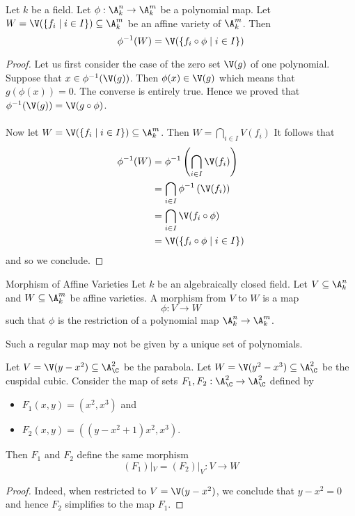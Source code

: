 \documentclass[a4paper]{article}
\begin{document}
\begin{prp}{}{} Let $k$ be a field. Let $\phi:\A_k^n\to\A_k^m$ be a polynomial map. Let $W=\V(\{f_i\;|\;i\in I\})\subseteq\A_k^m$ be an affine variety of $\A_k^m$. Then $$\phi^{-1}(W)=\V(\{f_i\circ\phi\;|\;i\in I\})$$ \tcbline
\begin{proof}
Let us first consider the case of the zero set $\V(g)$ of one polynomial. Suppose that $x\in\phi^{-1}(\V(g))$. Then $\phi(x)\in\V(g)$ which means that $g(\phi(x))=0$. The converse is entirely true. Hence we proved that $\phi^{-1}(\V(g))=\V(g\circ\phi)$. \\~\\

Now let $W=\V(\{f_i\;|\;i\in I\})\subseteq\A_k^m$. Then $W=\bigcap_{i\in I}V(f_i)$ It follows that 
\begin{align*}
\phi^{-1}(W)&=\phi^{-1}\left(\bigcap_{i\in I}\V(f_i)\right)\\
&=\bigcap_{i\in I}\phi^{-1}\left(\V(f_i)\right)\\
&=\bigcap_{i\in I}\V(f_i\circ\phi)\\
&=\V(\{f_i\circ\phi\;|\;i\in I\})
\end{align*}
and so we conclude. 
\end{proof}
\end{prp}

\begin{defn}{Morphism of Affine Varieties}{} Let $k$ be an algebraically closed field. Let $V\subseteq\A_k^n$ and $W\subseteq\A_k^m$ be affine varieties. A morphism from $V$ to $W$ is a map $$\phi:V\to W$$ such that $\phi$ is the restriction of a polynomial map $\A_k^n\to\A_k^m$. 
\end{defn}

Such a regular map may not be given by a unique set of polynomials. 

\begin{eg}{}{} Let $V=\V(y-x^2)\subseteq\A_\C^2$ be the parabola. Let $W=\V(y^2-x^3)\subseteq\A_\C^2$ be the cuspidal cubic. Consider the map of sets $F_1,F_2:\A_\C^2\to\A_\C^2$ defined by
\begin{itemize}
\item $F_1(x,y)=(x^2,x^3)$ and 
\item $F_2(x,y)=((y-x^2+1)x^2,x^3)$. 
\end{itemize}
Then $F_1$ and $F_2$ define the same morphism $$(F_1)|_V=(F_2)|_V:V\to W$$ \tcbline
\begin{proof}
Indeed, when restricted to $V=\V(y-x^2)$, we conclude that $y-x^2=0$ and hence $F_2$ simplifies to the map $F_1$. 
\end{proof}
\end{eg}
\end{document}
